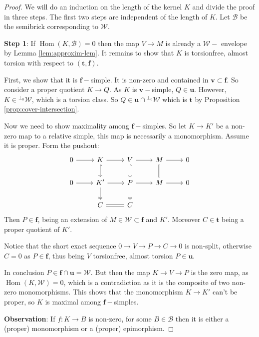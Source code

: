 \documentclass[11pt]{amsart}
\theoremstyle{definition}
\newcommand{\B}{\mathcal B}
\newcommand{\Hom}{\operatorname{Hom}}
\newcommand{\tpair}[2]{(\mathbf{#1}, \mathbf{#2})  }
\begin{document}
\begin{proof}
We will do an induction on the length of the kernel \( K \) and divide the proof in three steps. The first two steps are independent of the length of \( K \). Let \( \B \) be the semibrick corresponding to \( \mathcal{W} \).

\noindent\textbf{Step 1}: If \( \Hom(K, \B) = 0 \) then the map \( V \to M \) is already a \( \mathcal{W}-\) envelope by Lemma \ref{lem:approxim-lem}. It remains to show that \( K \) is torsionfree, almost torsion with respect to \( \tpair{t}{f} \). 

First, we show that it is \( \mathbf{f}-\)simple. It is non-zero and contained in $ \mathbf{v} \subset \mathbf{f} $. So consider a proper quotient \( K \to Q \). As \( K \) is \( \mathbf{v}-\)simple, \( Q \in \mathbf{u} \). However, \( K \in {}^{\perp_0} \mathcal{W} \), which is a torsion class. So \( Q \in \mathbf{u} \cap {}^{\perp_0} \mathcal{W} \) which is  \( \mathbf{t} \) by Proposition \ref{prop:cover-intersection}.

Now we need to show maximality among \( \mathbf{f}-\)simples. So let $ K \to K' $ be a non-zero map to a relative simple, this map is necessarily a monomorphism. Assume it is proper. Form the pushout:
\[
\begin{tikzcd}
0 \ar[r] & K \ar[r] \ar[d, hook] & V \ar[r] \ar[d, hook] & M \ar[r] \ar[d, equals] & 0 \\
0 \ar[r] & K' \ar[d, two heads] \ar[r] & P \ar[d, two heads] \ar[r] & M \ar[r] & 0 \\
& C \ar[r, equals] & C
\end{tikzcd}
\]
Then $ P \in \mathbf{f} $, being an extension of $ M \in \mathcal{W} \subset \mathbf{f} $ and $ K' $. Moreover \( C \in \mathbf{t} \) being a proper quotient of \( K' \).

 Notice that the short exact sequence \( 0 \to V \to P \to C \to 0 \) is non-split, otherwise \( C = 0 \) as \( P \in \mathbf{f} \), thus being \( V \) torsionfree, almost torsion \( P \in \mathbf{u} \).

In conclusion \( P \in \mathbf{f} \cap \mathbf{u} = \mathcal{W} \). But then the map \( K \to  V \to P \) is the zero map, as \( \Hom(K, \mathcal{W}) = 0 \), which is a contradiction as it is the composite of two non-zero monomorphisms. This shows that the monomorphism \( K \to K' \) can't be proper, so \( K \) is maximal among \( \mathbf{f}-\)simples.

\noindent \textbf{Observation}: If \( f : K \to B \) is non-zero, for some \( B \in \mathcal{B} \) then it is either a (proper) monomorphism or a (proper) epimorphism. 


\end{proof}
\end{document}
